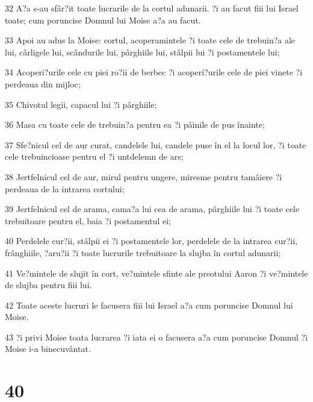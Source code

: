 \par 32 A?a s-au sfâr?it toate lucrarile de la cortul adunarii. ?i au facut fiii lui Israel toate; cum poruncise Domnul lui Moise a?a au facut.
\par 33 Apoi au adus la Moise: cortul, acoperamintele ?i toate cele de trebuin?a ale lui, cârligele lui, scândurile lui, pârghiile lui, stâlpii lui ?i postamentele lui;
\par 34 Acoperi?urile cele cu piei ro?ii de berbec ?i acoperi?urile cele de piei vinete ?i perdeaua din mijloc;
\par 35 Chivotul legii, capacul lui ?i pârghiile;
\par 36 Masa cu toate cele de trebuin?a pentru ea ?i pâinile de pus înainte;
\par 37 Sfe?nicul cel de aur curat, candelele lui, candele puse în el la locul lor, ?i toate cele trebuincioase pentru el ?i untdelemn de ars;
\par 38 Jertfelnicul cel de aur, mirul pentru ungere, miresme pentru tamâiere ?i perdeaua de la intrarea cortului;
\par 39 Jertfelnicul cel de arama, cama?a lui cea de arama, pârghiile lui ?i toate cele trebuitoare pentru el, baia ?i postamentul ei;
\par 40 Perdelele cur?ii, stâlpii ei ?i postamentele lor, perdelele de la intrarea cur?ii, frânghiile, ?aru?ii ?i toate lucrurile trebuitoare la slujba în cortul adunarii;
\par 41 Ve?mintele de slujit în cort, ve?mintele sfinte ale preotului Aaron ?i ve?mintele de slujba pentru fiii lui.
\par 42 Toate aceste lucruri le facusera fiii lui Israel a?a cum poruncise Domnul lui Moise.
\par 43 ?i privi Moise toata lucrarea ?i iata ei o facusera a?a cum poruncise Domnul ?i Moise i-a binecuvântat.

\chapter{40}

